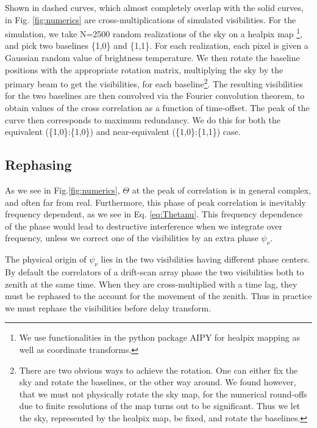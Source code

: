\documentclass[twocolumn,apj,numberedappendix]{emulateapj}
\renewcommand\[{\begin{equation}}
\renewcommand\]{\end{equation}}
\begin{document}
Shown in dashed curves, which almost completely overlap with the solid curves, in Fig. \ref{fig:numerics} are cross-multiplications of simulated visibilities. For the simulation, we take N=2500 random realizations of the sky
on a healpix map \citep{Heal, HealPrimer} \footnote{We use functionalities in the python package AIPY for healpix mapping
as well as coordinate transforms. }, and pick two baselines \{1,0\} and \{1,1\}. For each realization, each pixel is given a Gaussian random value
of brightness temperature. We then rotate the baseline positions with
the appropriate rotation matrix, multiplying the sky by the primary beam to get the visibilities, for each
baseline\footnote{There are two obvious ways to achieve the rotation. One
can either fix the sky and rotate the baselines, or the other way
around. We found however, that we must not physically rotate the sky
map, for the numerical round-offs due to finite resolutions of the
map turns out to be significant. Thus we let the sky, represented
by the healpix map, be fixed, and rotate the baselines. }. The resulting visibilities for the two baselines are then convolved
via the Fourier convolution theorem, to obtain values of the cross
correlation as a function of time-offset. The peak of the curve then
corresponds to maximum redundancy.  We do this for both the equivalent (\{1,0\}:\{1,0\}) and near-equivalent (\{1,0\}:\{1,1\}) case.



\subsection{Rephasing \label{sec:rephs}}
As we see in Fig.\ref{fig:numerics}, $\Theta$ at the peak of correlation is in general complex, and often far from real. Furthermore, this phase of peak correlation is inevitably frequency dependent, as we see in Eq. \ref{eq:Thetanu}. This frequency dependence of the phase would lead to destructive interference when we integrate over frequency, unless we correct one of the visibilities by an extra phase $\psi_\nu$. 

The physical origin of $\psi_\nu$ lies in the two visibilities having different phase centers. By default the correlators of a drift-scan array phase the two visibilities both to zenith at the same time. When they are cross-multiplied with a time lag, they must be rephased to the account for the movement of the zenith. Thus in practice we must rephase the visibilities before delay transform. 
\end{document}
